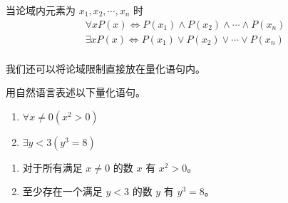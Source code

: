 \begin{definition}[有限论域上的量化]\label{def:有限域上的量化}
    当论域内元素为 $x_1, x_2, \cdots, x_n$ 时
    \begin{equation*}
        \begin{gathered}
            \forall x P(x) \iff P(x_1) \land P(x_2) \land \cdots \land P(x_n) \\
            \exists x P(x) \iff P(x_1) \lor P(x_2) \lor \cdots \lor P(x_n) \\
        \end{gathered}
    \end{equation*}
\end{definition}

我们还可以将论域限制直接放在量化语句内。
\begin{collections}
    \begin{example}
        用自然语言表述以下量化语句。
        \begin{enumerate}
            \item $\forall x \neq 0(x^2 > 0)$
            \item $\exists y < 3(y^3 = 8)$
        \end{enumerate}
    \end{example}

    \begin{solution}
        \begin{enumerate}
            \item 对于所有满足 $x \neq 0$ 的数 $x$ 有 $x^2 > 0$。
            \item 至少存在一个满足 $y < 3$ 的数 $y$ 有 $y^3 = 8$。
        \end{enumerate}
    \end{solution}
\end{collections}

